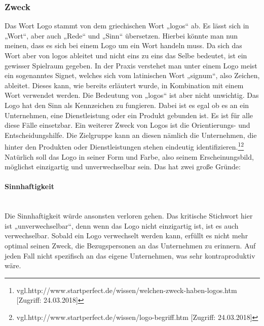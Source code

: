 \subsubsection{Zweck}
Das Wort Logo stammt von dem griechischen Wort „logos“ ab. Es lässt sich in „Wort“, aber auch „Rede“ und „Sinn“ übersetzen. Hierbei könnte man nun meinen, dass es sich bei einem Logo um ein Wort handeln muss. Da sich das Wort aber von logos ableitet und nicht eins zu eins das Selbe bedeutet, ist ein gewisser Spielraum gegeben. In der Praxis verstehet man unter einem Logo meist ein sogenanntes Signet, welches sich vom latinischen Wort „signum“, also Zeichen, ableitet. Dieses kann, wie bereits erläutert wurde, in Kombination mit einem Wort verwendet werden. Die Bedeutung von „logos“ ist aber nicht unwichtig. Das Logo hat den Sinn als Kennzeichen zu fungieren. Dabei ist es egal ob es an ein Unternehmen, eine Dienstleistung oder ein Produkt gebunden ist. Es ist für alle diese Fälle einsetzbar. Ein weiterer Zweck von Logos ist die Orientierungs- und Entscheidungshilfe. Die Zielgruppe kann an diesen nämlich die Unternehmen, die hinter den Produkten oder Dienstleistungen stehen eindeutig identifizieren.\footnote{\label{} vgl.http://www.startperfect.de/wissen/welchen-zweck-haben-logos.htm [Zugriff: 24.03.2018]}\footnote{\label{} vgl.http://www.startperfect.de/wissen/logo-begriff.htm [Zugriff: 24.03.2018]}
\\ 
Natürlich soll das Logo in seiner Form und Farbe, also seinem Erscheinungsbild, möglichst einzigartig und unverwechselbar sein. Das hat zwei große Gründe:

\paragraph{Sinnhaftigkeit}
\leavevmode \\
Die Sinnhaftigkeit würde ansonsten verloren gehen. Das kritische Stichwort hier ist „unverwechselbar“, denn wenn das Logo nicht einzigartig ist, ist es auch verwechselbar. Sobald ein Logo verwechselt werden kann, erfüllt es nicht mehr optimal seinen Zweck, die Bezugspersonen an das Unternehmen zu erinnern. Auf jeden Fall nicht spezifisch an das eigene Unternehmen, was sehr kontraproduktiv wäre.


